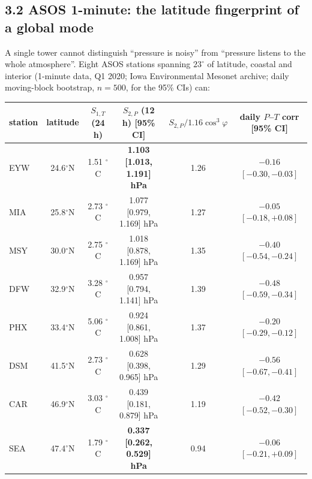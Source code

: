 \documentclass[aps,prfluids,preprint,superscriptaddress,nofootinbib]{revtex4-2}
\begin{document}
\subsection*{3.2 ASOS 1-minute: the latitude fingerprint of a global mode}

A single tower cannot distinguish ``pressure is noisy'' from ``pressure listens to the whole atmosphere''. Eight ASOS stations spanning $23^{\circ}$ of latitude, coastal and interior (1-minute data, Q1 2020; Iowa Environmental Mesonet archive; daily moving-block bootstrap, $n=500$, for the 95\% CIs) can:

\begin{center}\small
\begin{tabular}{lccccc}
\toprule
station & latitude & $S_{1,T}$ (24 h) & $S_{2,P}$ (12 h) [95\% CI] & $S_{2,P}/1.16\cos^{3}\varphi$ & daily $P$--$T$ corr [95\% CI] \\
\midrule
EYW & 24.6$^{\circ}$N & 1.51 $^{\circ}$C & \textbf{1.103 [1.013, 1.191] hPa} & 1.26 & $-0.16$ $[-0.30, -0.03]$ \\
MIA & 25.8$^{\circ}$N & 2.73 $^{\circ}$C & 1.077 [0.979, 1.169] hPa & 1.27 & $-0.05$ $[-0.18, +0.08]$ \\
MSY & 30.0$^{\circ}$N & 2.75 $^{\circ}$C & 1.018 [0.878, 1.169] hPa & 1.35 & $-0.40$ $[-0.54, -0.24]$ \\
DFW & 32.9$^{\circ}$N & 3.28 $^{\circ}$C & 0.957 [0.794, 1.141] hPa & 1.39 & $-0.48$ $[-0.59, -0.34]$ \\
PHX & 33.4$^{\circ}$N & 5.06 $^{\circ}$C & 0.924 [0.861, 1.008] hPa & 1.37 & $-0.20$ $[-0.29, -0.12]$ \\
DSM & 41.5$^{\circ}$N & 2.73 $^{\circ}$C & 0.628 [0.398, 0.965] hPa & 1.29 & $-0.56$ $[-0.67, -0.41]$ \\
CAR & 46.9$^{\circ}$N & 3.03 $^{\circ}$C & 0.439 [0.181, 0.879] hPa & 1.19 & $-0.42$ $[-0.52, -0.30]$ \\
SEA & 47.4$^{\circ}$N & 1.79 $^{\circ}$C & \textbf{0.337 [0.262, 0.529] hPa} & 0.94 & $-0.06$ $[-0.21, +0.09]$ \\
\bottomrule
\end{tabular}
\end{center}
\end{document}
